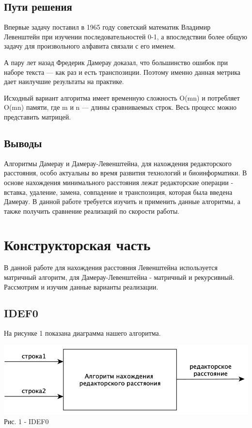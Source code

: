 \documentclass[a4paper,14pt]{article} %
\begin{document}
        \subsection{Пути решения}
        \hfill
        
        Впервые задачу поставил в 1965 году советский математик Владимир Левенштейн при изучении последовательностей 0-1, а впоследствии более общую задачу для произвольного алфавита связали с его именем. 
        
        \hfill
        
        А пару лет назад Фредерик Дамерау доказал, что большинство ошибок при наборе текста — как раз и есть транспозиции. Поэтому именно данная метрика дает наилучшие результаты на практике.
        
        \hfill
        
        Исходный вариант алгоритма имеет временную сложность O(mn) и потребляет O(mn) памяти, где m и n — длины сравниваемых строк. Весь процесс можно представить матрицей. 
        
           \subsection{Выводы} 
           \hfill
           
           Алгоритмы Дамерау и Дамерау-Левенштейна, для нахождения редакторского расстояния, особо актуальны во время развития технологий и биоинформатики. В основе нахождения минимального расстояния лежат редакторские операции - вставка, удаление, замена, совпадение и транспозиция, которая была введена Дамерау. В данной работе требуется изучить и применить данные алгоритмы, а также получить сравнение реализаций по скорости работы. 
	  
	\newpage

	\section{Конструкторская часть}
	\hfill
	
	В данной работе для нахождения расстояния Левенштейна используется матричный алгоритм, для Дамерау-Левенштейна - матричный и рекурсивный. Рассмотрим и изучим данные варианты реализации. 
	\subsection{IDEF0}
	\hfill
	
	На рисунке 1 показана диаграмма нашего алгоритма.  
	\begin{center}
		\includegraphics[scale = 0.5]{idef0} \\ Рис.  1 - IDEF0
	\end{center}
        
\end{document}
